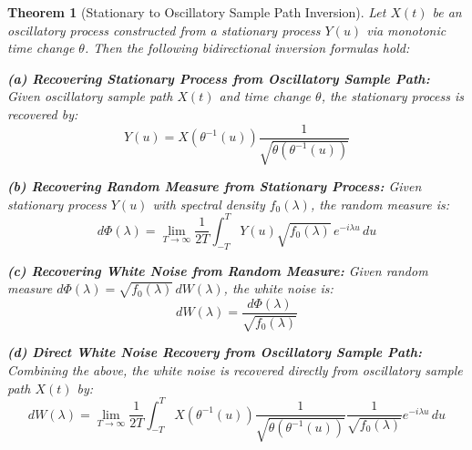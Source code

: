 \documentclass{article}
\newtheorem{theorem}{Theorem}
\begin{document}
\begin{theorem}[Stationary to Oscillatory Sample Path Inversion]
Let $X(t)$ be an oscillatory process constructed from a stationary process $Y(u)$ via monotonic time change $\theta$. Then the following bidirectional inversion formulas hold:

\textbf{(a) Recovering Stationary Process from Oscillatory Sample Path:}
Given oscillatory sample path $X(t)$ and time change $\theta$, the stationary process is recovered by:
\[
Y(u) = X(\theta^{-1}(u)) \frac{1}{\sqrt{\dot\theta(\theta^{-1}(u))}}
\]

\textbf{(b) Recovering Random Measure from Stationary Process:}
Given stationary process $Y(u)$ with spectral density $f_0(\lambda)$, the random measure is:
\[
d\Phi(\lambda) = \lim_{T\to\infty} \frac{1}{2T} \int_{-T}^T Y(u) \sqrt{f_0(\lambda)}\, e^{-i\lambda u}\, du
\]

\textbf{(c) Recovering White Noise from Random Measure:}
Given random measure $d\Phi(\lambda) = \sqrt{f_0(\lambda)}\, dW(\lambda)$, the white noise is:
\[
dW(\lambda) = \frac{d\Phi(\lambda)}{\sqrt{f_0(\lambda)}}
\]

\textbf{(d) Direct White Noise Recovery from Oscillatory Sample Path:}
Combining the above, the white noise is recovered directly from oscillatory sample path $X(t)$ by:
\[
dW(\lambda) = \lim_{T\to\infty} \frac{1}{2T} \int_{-T}^T X(\theta^{-1}(u)) \frac{1}{\sqrt{\dot\theta(\theta^{-1}(u))}} \frac{1}{\sqrt{f_0(\lambda)}} e^{-i\lambda u}\, du
\]
\end{theorem}
\end{document}

